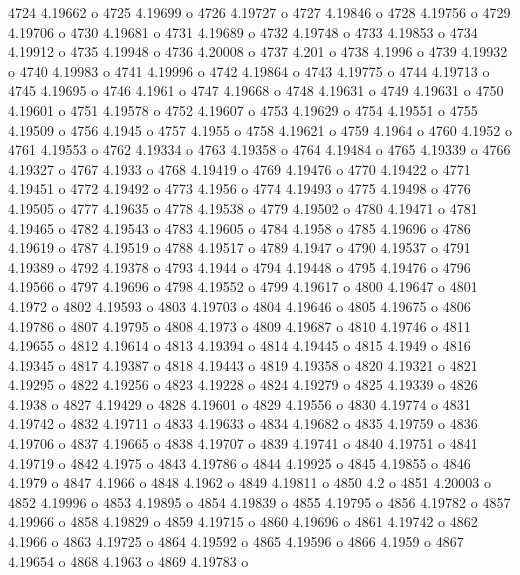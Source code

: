  4724  4.19662  o
 4725  4.19699  o
 4726  4.19727  o
 4727  4.19846  o
 4728  4.19756  o
 4729  4.19706  o
 4730  4.19681  o
 4731  4.19689  o
 4732  4.19748  o
 4733  4.19853  o
 4734  4.19912  o
 4735  4.19948  o
 4736  4.20008  o
 4737  4.201  o
 4738  4.1996  o
 4739  4.19932  o
 4740  4.19983  o
 4741  4.19996  o
 4742  4.19864  o
 4743  4.19775  o
 4744  4.19713  o
 4745  4.19695  o
 4746  4.1961  o
 4747  4.19668  o
 4748  4.19631  o
 4749  4.19631  o
 4750  4.19601  o
 4751  4.19578  o
 4752  4.19607  o
 4753  4.19629  o
 4754  4.19551  o
 4755  4.19509  o
 4756  4.1945  o
 4757  4.1955  o
 4758  4.19621  o
 4759  4.1964  o
 4760  4.1952  o
 4761  4.19553  o
 4762  4.19334  o
 4763  4.19358  o
 4764  4.19484  o
 4765  4.19339  o
 4766  4.19327  o
 4767  4.1933  o
 4768  4.19419  o
 4769  4.19476  o
 4770  4.19422  o
 4771  4.19451  o
 4772  4.19492  o
 4773  4.1956  o
 4774  4.19493  o
 4775  4.19498  o
 4776  4.19505  o
 4777  4.19635  o
 4778  4.19538  o
 4779  4.19502  o
 4780  4.19471  o
 4781  4.19465  o
 4782  4.19543  o
 4783  4.19605  o
 4784  4.1958  o
 4785  4.19696  o
 4786  4.19619  o
 4787  4.19519  o
 4788  4.19517  o
 4789  4.1947  o
 4790  4.19537  o
 4791  4.19389  o
 4792  4.19378  o
 4793  4.1944  o
 4794  4.19448  o
 4795  4.19476  o
 4796  4.19566  o
 4797  4.19696  o
 4798  4.19552  o
 4799  4.19617  o
 4800  4.19647  o
 4801  4.1972  o
 4802  4.19593  o
 4803  4.19703  o
 4804  4.19646  o
 4805  4.19675  o
 4806  4.19786  o
 4807  4.19795  o
 4808  4.1973  o
 4809  4.19687  o
 4810  4.19746  o
 4811  4.19655  o
 4812  4.19614  o
 4813  4.19394  o
 4814  4.19445  o
 4815  4.1949  o
 4816  4.19345  o
 4817  4.19387  o
 4818  4.19443  o
 4819  4.19358  o
 4820  4.19321  o
 4821  4.19295  o
 4822  4.19256  o
 4823  4.19228  o
 4824  4.19279  o
 4825  4.19339  o
 4826  4.1938  o
 4827  4.19429  o
 4828  4.19601  o
 4829  4.19556  o
 4830  4.19774  o
 4831  4.19742  o
 4832  4.19711  o
 4833  4.19633  o
 4834  4.19682  o
 4835  4.19759  o
 4836  4.19706  o
 4837  4.19665  o
 4838  4.19707  o
 4839  4.19741  o
 4840  4.19751  o
 4841  4.19719  o
 4842  4.1975  o
 4843  4.19786  o
 4844  4.19925  o
 4845  4.19855  o
 4846  4.1979  o
 4847  4.1966  o
 4848  4.1962  o
 4849  4.19811  o
 4850  4.2  o
 4851  4.20003  o
 4852  4.19996  o
 4853  4.19895  o
 4854  4.19839  o
 4855  4.19795  o
 4856  4.19782  o
 4857  4.19966  o
 4858  4.19829  o
 4859  4.19715  o
 4860  4.19696  o
 4861  4.19742  o
 4862  4.1966  o
 4863  4.19725  o
 4864  4.19592  o
 4865  4.19596  o
 4866  4.1959  o
 4867  4.19654  o
 4868  4.1963  o
 4869  4.19783  o

